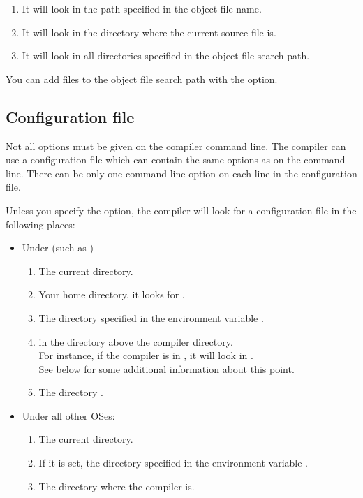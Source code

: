 \begin{enumerate}
\item It will look in the path specified in the object file name.
\item It will look in the directory where the current source file is.
\item It will look in all directories specified in the object file search path.
\end{enumerate}
You can add files to the object file search path with the  option.

\subsection{Configuration file}
\label{searchconfig}
Not all options must be given on the compiler command line. The compiler
can use a configuration file which can contain the same options as on the
command line. There can be only one command-line option on each line in
the configuration file.

Unless you specify the  option, the compiler will look
for a configuration file  in the following places:

\begin{itemize}
\item Under \unix (such as \linux)
\begin{enumerate}
\item The current directory.
\item Your home directory, it looks for .
\item The directory specified in the environment
variable .
\item in the  directory above the compiler directory.\\
For instance, if the compiler is in , it will look in
. \\
See below for some additional information about this point.

\item The directory .
\end{enumerate}
\item Under all other OSes:
\begin{enumerate}
\item The current directory.
\item If it is set, the directory specified in the environment variable
.
\item The directory where the compiler is.
\end{enumerate}
\end{itemize}

